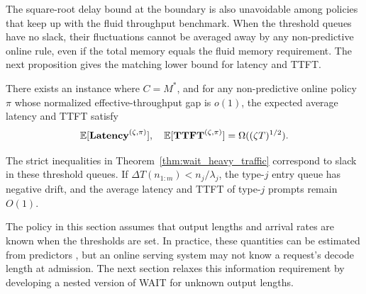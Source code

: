 The square-root delay bound at the boundary is also unavoidable among policies that keep up with the fluid throughput benchmark. When the threshold queues have no slack, their fluctuations cannot be averaged away by any non-predictive online rule, even if the total memory equals the fluid memory requirement. The next proposition gives the matching lower bound for latency and TTFT.
\begin{proposition}\label{prop::simple random walk, tight bound}
There exists an instance where \( C = M^* \), and for any non-predictive online policy \(\pi\) whose normalized effective-throughput gap is \(o(1)\), the expected average latency and TTFT satisfy
\[
\mathbb{E}[\textbf{Latency}^{(\zeta,\pi)}],\quad \mathbb{E}[\textbf{TTFT}^{(\zeta,\pi)}] = \Omega((\zeta T)^{1/2}).
\]
\end{proposition}
The strict inequalities in Theorem~\ref{thm:wait_heavy_traffic} correspond to slack in these threshold queues. If \(\Delta T(n_{1:m})<n_j/\lambda_j\), the type-\(j\) entry queue has negative drift, and the average latency and TTFT of type-\(j\) prompts remain \(O(1)\).

The policy in this section assumes that output lengths and arrival rates are known when the thresholds are set. In practice, these quantities can be estimated from predictors \citep{fu2025efficient}, but an online serving system may not know a request's decode length at admission. The next section relaxes this information requirement by developing a nested version of WAIT for unknown output lengths.
